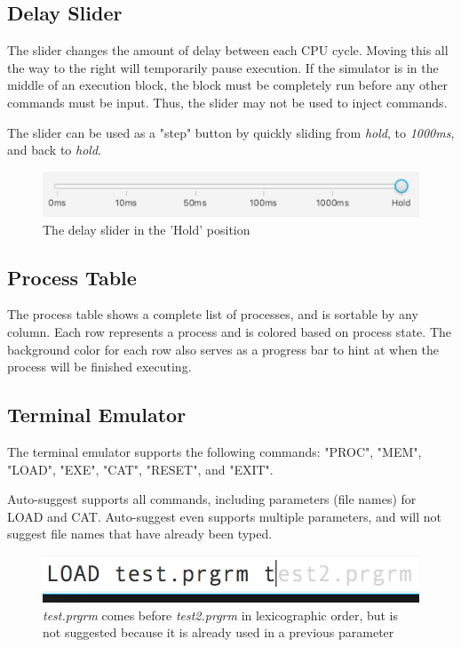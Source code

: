 \documentclass[paper=a4, fontsize=11pt]{scrartcl} %
\numberwithin{equation}{section} %
\numberwithin{figure}{section} %
\numberwithin{table}{section} %
\begin{document}
\subsection{Delay Slider}
The slider changes the amount of delay between each CPU cycle. Moving this all the way to the right will temporarily pause execution. If the simulator is in the middle of an execution block, the block must be completely run before any other commands must be input. Thus, the slider may not be used to inject commands.

The slider can be used as a "step" button by quickly sliding from \textit{hold}, to \textit{1000ms}, and back to \textit{hold}.
\begin{figure}[H]
  \centering
    \includegraphics[scale=.5]{DelaySlider.png}
  \caption{The delay slider in the 'Hold' position}
\end{figure}

\subsection{Process Table}
The process table shows a complete list of processes, and is sortable by any column. Each row represents a process and is colored based on process state. The background color for each row also serves as a progress bar to hint at when the process will be finished executing.

\subsection{Terminal Emulator}
The terminal emulator supports the following commands: "PROC", "MEM", "LOAD", "EXE", "CAT", "RESET", and "EXIT".

Auto-suggest supports all commands, including parameters (file names) for LOAD and CAT. Auto-suggest even supports multiple parameters, and will not suggest file names that have already been typed.

\begin{figure}[H]
  \centering
    \includegraphics[scale=.5]{AutoSuggest.png}
  \caption{\textit{test.prgrm} comes before \textit{test2.prgrm} in lexicographic order, but is not suggested because it is already used in a previous parameter }
\end{figure}
\end{document}
